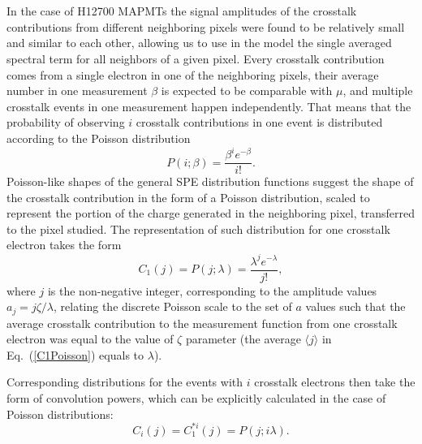 \newpage
\newpage
\appendix
\section{}
\label{AppendixA}

In the case of H12700 MAPMTs the signal amplitudes of the crosstalk contributions from different neighboring pixels were found to be relatively small and similar to each other, allowing us to use in the model the single averaged spectral term for all neighbors of a given pixel. Every crosstalk contribution comes from a single electron in one of the neighboring pixels, their average number in one measurement $\beta$ is expected to be comparable with $\mu$, and multiple crosstalk events in one measurement happen independently. That means that the probability of observing $i$ crosstalk contributions in one event is distributed according to the Poisson distribution
\begin{equation}
\label{CTPoisson}
 P(i;\beta) = \frac{\beta^{i} e^{-\beta}}{i!}.
\end{equation}
Poisson-like shapes of the general SPE distribution functions suggest the shape of the crosstalk contribution in the form of a Poisson distribution, scaled to represent the portion of the charge generated in the neighboring pixel, transferred to the pixel studied. The representation of such distribution for one crosstalk electron takes the form
\begin{equation}
\label{C1Poisson}
 C_1(j) = P(j;\lambda) = \frac{\lambda^{j} e^{-\lambda}}{j!},
\end{equation}
where $j$ is the non-negative integer, corresponding to the amplitude values $a_j = j \zeta / \lambda $, relating the discrete Poisson scale to the set of $a$ values such that the average crosstalk contribution to the measurement function from one crosstalk electron was equal to the value of $\zeta$ parameter (the average $\langle j \rangle$ in Eq.~(\ref{C1Poisson}) equals to $\lambda$).

Corresponding distributions for the events with $i$ crosstalk electrons then take the form of convolution powers, which can be explicitly calculated in the case of Poisson distributions: 
\begin{equation}
\label{CiPoisson}
 C_i(j) = C_1^{*i}(j) = P(j;i\lambda).
\end{equation}

